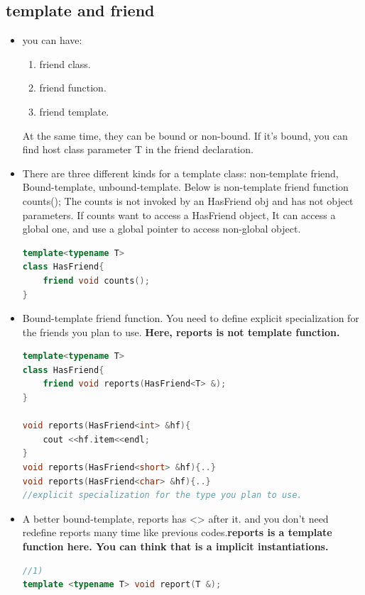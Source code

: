 \documentclass[a4paper,11pt,twoside]{book}
\begin{document}
\subsection{template and friend}
\begin{itemize}
	\item you can have:
	\begin{enumerate}
		\item friend class.
		\item friend function.
		\item friend template.
	\end{enumerate}
	At the same time, they can be bound or non-bound. If it's bound, you can find host class parameter T in the friend declaration. 
	
	\item  There are three different kinds for a template class: non-template friend,  Bound-template, unbound-template. Below is non-template friend function counts(); The counts is not invoked by an HasFriend obj and has not object parameters.  If counts want to access a HasFriend object, It can access a global one, and use a global pointer to access non-global object.
\begin{lstlisting}[frame=single, language=c++]
template<typename T>
class HasFriend{
	friend void counts();
}
\end{lstlisting}
	
	\item Bound-template friend function. You need to define explicit specialization for the friends you plan to use. \textbf{Here, reports is not template function. }
	
\begin{lstlisting}[frame=single, language=c++]
template<typename T>
class HasFriend{
	friend void reports(HasFriend<T> &);
}
	
void reports(HasFriend<int> &hf){
	cout <<hf.item<<endl;
}
void reports(HasFriend<short> &hf){..}
void reports(HasFriend<char> &hf){..}
//explicit specialization for the type you plan to use.
\end{lstlisting}
	
	\item A better bound-template, reports has <> after it.  and you don't need redefine reports many time like previous codes.\textbf{reports is a template function here. You can think that is a implicit instantiations. }
\begin{lstlisting}[frame=single, language=c++]
//1) 
template <typename T> void report(T &);
	

\end{lstlisting}
\end{itemize}
\end{document}
